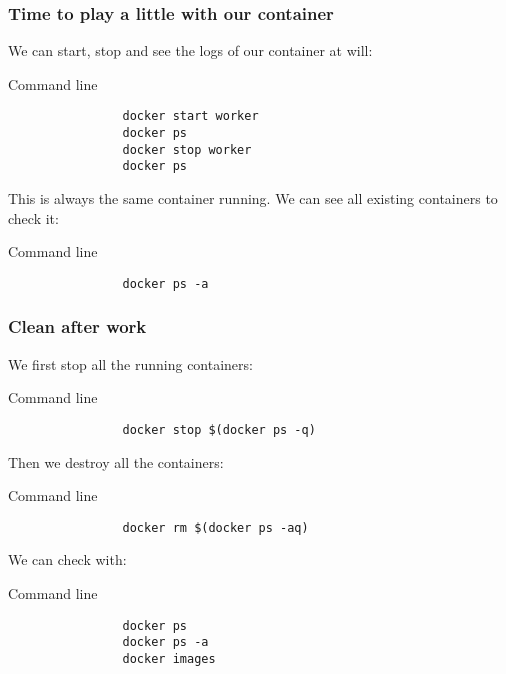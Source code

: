 	\begin{frame}[fragile]
		\frametitle{Time to play a little with our container}
		
		We can start, stop and see the logs of our container at will:
		\begin{block}{Command line}
			\begin{verbatim}
				docker start worker
				docker ps
				docker stop worker
				docker ps
			\end{verbatim}
		\end{block}
		
		\bigskip
		This is always the same container running. We can see all existing containers to check it:
		\begin{block}{Command line}
			\begin{verbatim}
				docker ps -a
			\end{verbatim}
		\end{block}

	\end{frame}
	
	\begin{frame}[fragile]
		\frametitle{Clean after work}
		
		We first stop all the running containers:
		\begin{block}{Command line}
			\begin{verbatim}
				docker stop $(docker ps -q)
			\end{verbatim}
		\end{block}
		
		\bigskip
		Then we destroy all the containers:
		\begin{block}{Command line}
			\begin{verbatim}
				docker rm $(docker ps -aq)
			\end{verbatim}
		\end{block}
		
		\bigskip
		We can check with:
		\begin{block}{Command line}
			\begin{verbatim}
				docker ps
				docker ps -a
				docker images
			\end{verbatim}
		\end{block}

	\end{frame}